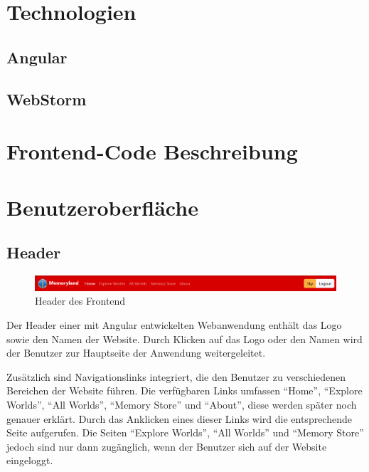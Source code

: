 
\section{Technologien}

\subsection{Angular}

\subsection{WebStorm}

\section{Frontend-Code Beschreibung}



\section{Benutzeroberfläche}

\subsection{Header}

\begin{figure} [h t]
    \centering
    \includegraphics[scale=0.5]{pics/header_login.PNG}
    \caption{Header des Frontend}
    \label{fig:header-frontend}
\end{figure}

Der Header einer mit Angular entwickelten Webanwendung enthält das Logo sowie 
den Namen der Website. Durch Klicken auf das Logo oder den Namen wird der 
Benutzer zur Hauptseite der Anwendung weitergeleitet.

Zusätzlich sind Navigationslinks integriert, die den Benutzer zu verschiedenen 
Bereichen der Website führen. Die verfügbaren Links umfassen ``Home'', ``Explore 
Worlds'', ``All Worlds'', ``Memory Store'' und ``About'', diese werden später noch 
genauer erklärt. Durch das Anklicken eines dieser Links wird die entsprechende 
Seite aufgerufen. Die Seiten ``Explore Worlds'', ``All Worlds'' und ``Memory Store'' 
jedoch sind nur dann zugänglich, wenn der Benutzer sich auf der Website 
eingeloggt.


